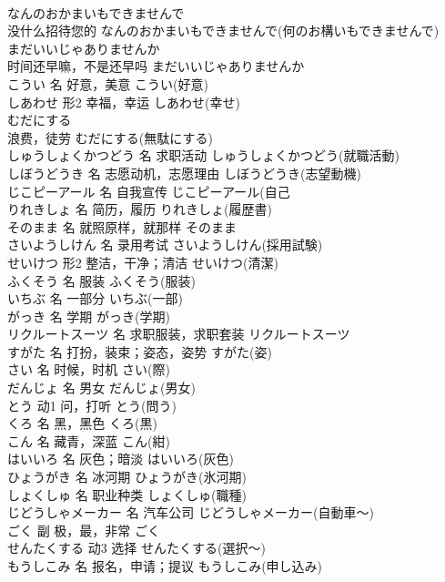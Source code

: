 \documentclass[8pt]{extreport}
\begin{document}
\begin{CJK}{UTF8}{min}
\\	なんのおかまいもできませんで	
\\	没什么招待您的	なんのおかまいもできませんで(何のお構いもできませんで)	
\\	まだいいじゃありませんか	
\\	时间还早嘛，不是还早吗	まだいいじゃありませんか	
\\	こうい	名	好意，美意	こうい(好意)	
\\	しあわせ	形2	幸福，幸运	しあわせ(幸せ)	
\\	むだにする	
\\	浪费，徒劳	むだにする(無駄にする)	
\\	しゅうしょくかつどう	名	求职活动	しゅうしょくかつどう(就職活動)	
\\	しぼうどうき	名	志愿动机，志愿理由	しぼうどうき(志望動機)	
\\	じこピーアール	名	自我宣传	じこピーアール(自己
\\	りれきしょ	名	简历，履历	りれきしょ(履歴書)	
\\	そのまま	名	就照原样，就那样	そのまま	
\\	さいようしけん	名	录用考试	さいようしけん(採用試験)	
\\	せいけつ	形2	整洁，干净；清洁	せいけつ(清潔)	
\\	ふくそう	名	服装	ふくそう(服装)	
\\	いちぶ	名	一部分	いちぶ(一部)	
\\	がっき	名	学期	がっき(学期)	
\\	リクルートスーツ	名	求职服装，求职套装	リクルートスーツ	
\\	すがた	名	打扮，装束；姿态，姿势	すがた(姿)	
\\	さい	名	时候，时机	さい(際)	
\\	だんじょ	名	男女	だんじょ(男女)	
\\	とう	动1	问，打听	とう(問う)	
\\	くろ	名	黑，黑色	くろ(黒)	
\\	こん	名	藏青，深蓝	こん(紺)	
\\	はいいろ	名	灰色；暗淡	はいいろ(灰色)	
\\	ひょうがき	名	冰河期	ひょうがき(氷河期)	
\\	しょくしゅ	名	职业种类	しょくしゅ(職種)	
\\	じどうしゃメーカー	名	汽车公司	じどうしゃメーカー(自動車～)	
\\	ごく	副	极，最，非常	ごく	
\\	せんたくする	动3	选择	せんたくする(選択～)	
\\	もうしこみ	名	报名，申请；提议	もうしこみ(申し込み)	

\end{CJK}
\end{document}
